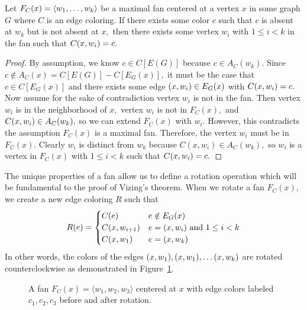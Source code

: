\begin{lemma}\label{fanmax_present}
    Let $F_C(x) = \langle w_1, \dots, w_k\rangle$ be a maximal fan centered at a vertex $x$ in some graph $G$ where $C$ is an edge coloring. If there exists some color $c$ such that $c$ is absent at $w_k$ but is not absent at $x,$ then there exists some vertex $w_i$ with $1 \leq i < k$ in the fan such that $C(x, w_i) = c.$ 
\end{lemma}
\begin{proof}
    By assumption, we know $c \in C[E(G)]$ because $c \in A_C(w_k).$ Since $c \notin A_C(x) = C[E(G)] - C[E_G(x)],$ it must be the case that $c \in C[E_G(x)]$ and there exists some edge $(x, w_i)\in E_G(x)$ with $C(x, w_i) = c.$ Now assume for the sake of contradiction vertex $w_i$ is not in the fan. Then vertex $w_i$ is in the neighborhood of $x,$ vertex $w_i$ is not in $F_C(x),$ and $C(x, w_i) \in A_C(w_k),$ so we can extend $F_C(x)$ with $w_i.$ However, this contradicts the assumption $F_C(x)$ is a maximal fan. Therefore, the vertex $w_i$ must be in $F_C(x).$ Clearly $w_i$ is distinct from $w_k$ because $C(x, w_i) \in A_C(w_k),$ so $w_i$ is a vertex in $F_C(x)$ with $1 \leq i < k$ such that $C(x, w_i) = c.$
\end{proof}

The unique properties of a fan allow us to define a rotation operation which will be fundamental to the proof of Vizing's theorem. When we rotate a fan $F_C(x),$ we create a new edge coloring $R$ such that
\begin{equation*}
    R(e) = \begin{cases}
        C(e) & e \notin E_G({x}) \\
        C(x, w_{i+1}) & e = (x, w_i) \text{ and } 1 \leq i < k \\
        C(x, w_1) & e = (x, w_k)
    \end{cases}
\end{equation*}
In other words, the colors of the edges $(x, w_1), (x, w_1), \dots (x, w_k)$ are rotated counterclockwise as demonstrated in Figure~\ref{fig:rotation}.

\begin{figure}
    \centering
    
    \caption{A fan $F_C(x)=\langle w_1, w_2, w_3\rangle$ centered at $x$ with edge colors labeled $c_1, c_2, c_3$ before and after rotation.}
    \label{fig:rotation}
\end{figure}

